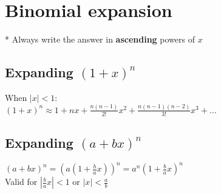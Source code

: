 \section{Binomial expansion}
* Always write the answer in \textbf{ascending} powers of $x$
\subsection{Expanding $(1+x)^n$}
When $|x|<1$:\\
$(1+x)^n\approx 1 + nx + \frac{n(n-1)}{2!}x^2+\frac{n(n-1)(n-2)}{3!}x^3+\dots$
\subsection{Expanding $(a+bx)^n$}
$(a+bx)^n = \left(a\left(1+\frac{b}{a}x\right)\right)^n = a^n\left(1+\frac{b}{a}x\right)^n$\\
Valid for $\left|\frac{b}{a}x\right|<1$ or $|x| < \frac{a}{b}$